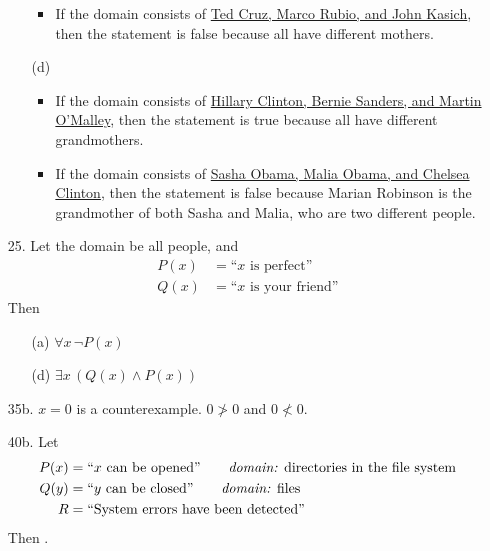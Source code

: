 \documentclass{article}
\begin{document}
\begin{enumerate}
\begin{itemize}
\begin{itemize}
                    \item If the domain consists of \underline{Ted Cruz, Marco Rubio, and John Kasich}, then the statement is false because all have different mothers.
                \end{itemize}
            \item[(d)]
                \begin{itemize}
                    \item If the domain consists of \underline{Hillary Clinton, Bernie Sanders, and Martin O'Malley}, then the statement is true because all have different grandmothers.
                    \item If the domain consists of \underline{Sasha Obama, Malia Obama, and Chelsea Clinton}, then the statement is false because Marian Robinson is the grandmother of both Sasha and Malia, who are two different people.
                \end{itemize}
        \end{itemize}
    \item[25.] Let the domain be all people, and
        \begin{align*}
        P(x) &= \textrm{``$x$ is perfect''}\\
        Q(x) &= \textrm{``$x$ is your friend''}
        \end{align*}
        Then
        \begin{itemize}
            \item[(a)] $\forall x \, \neg P(x)$
            \item[(d)] $\exists x \, \left( Q(x) \land P(x) \right)$
        \end{itemize}
    \item[35b.] $x = 0$ is a counterexample. $0 \ngtr 0$ and $0 \nless 0$.
    \item[40b.] Let
        \begin{align*}
        P(x) &= \textrm{``$x$ can be opened''} \tag*{\textit{domain:} directories in the file system}\\
        Q(y) &= \textrm{``$y$ can be closed''} \tag*{\textit{domain:} files}\\
        R &= \textrm{``System errors have been detected''}
        \end{align*}
    Then .


\end{enumerate}
\end{document}
